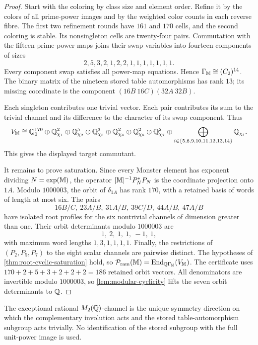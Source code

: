 \begin{proof}
Start with the coloring by class size and element order.  Refine it by the
colors of all prime-power images and by the weighted color counts in each
reverse fibre.  The first two refinement rounds have \(161\) and \(170\)
cells, and the second coloring is stable.  Its nonsingleton cells are
twenty-four pairs.  Commutation with the fifteen prime-power maps joins
their swap variables into fourteen components of sizes
\[
 2,5,3,2,1,2,2,1,1,1,1,1,1,1.
\]
Every component swap satisfies all power-map equations.  Hence
\(\Gamma_{\mathbb M}\cong(C_2)^{14}\).  The binary matrix of the nineteen stored
table automorphisms has rank \(13\); its missing coordinate is the component
\((16B\ 16C)(32A\ 32B)\).

Each singleton contributes one trivial vector.  Each pair contributes its
sum to the trivial channel and its difference to the character of its swap
component.  Thus
\[
 V_{\mathbb M}\cong
 \mathbb Q_{\mathbf1}^{170}\oplus
 \mathbb Q_{\chi_1}^{2}\oplus\mathbb Q_{\chi_2}^{5}\oplus
 \mathbb Q_{\chi_3}^{3}\oplus\mathbb Q_{\chi_4}^{2}\oplus
 \mathbb Q_{\chi_6}^{2}\oplus\mathbb Q_{\chi_7}^{2}
 \oplus\bigoplus_{i\in\{5,8,9,10,11,12,13,14\}}\mathbb Q_{\chi_i}.
\]
This gives the displayed target commutant.

It remains to prove saturation.  Since every Monster element has exponent
dividing \(N=\exp(\mathbb M)\), the operator
\(|\mathbb M|^{-1}P_N^*P_N\) is the coordinate projection onto \(1A\).
Modulo \(1000003\), the orbit of \(\delta_{1A}\) has rank \(170\), with a
retained basis of words of length at most six.  The pairs
\[
 16B/C,\ 23A/B,\ 31A/B,\ 39C/D,\ 44A/B,\ 47A/B
\]
have isolated root profiles for the six nontrivial channels of dimension
greater than one.  Their orbit determinants modulo \(1000003\) are
\[
 1,\ 2,\ 1,\ 1,\ -1,\ 1,
\]
with maximum word lengths \(1,3,1,1,1,1\).  Finally, the restrictions of
\((P_2,P_5,P_7)\) to the eight scalar channels are pairwise distinct.
The hypotheses of \cref{thm:root-cyclic-saturation} hold, so
\(\mathcal P_{\mathrm{ram}}(\mathbb M)=\operatorname{End}_{\mathbb Q\Gamma_{\mathbb M}}(V_{\mathbb M})\).  The certificate uses
\(170+2+5+3+2+2+2=186\) retained orbit vectors.  All denominators are
invertible modulo \(1000003\), so \cref{lem:modular-cyclicity} lifts the
seven orbit determinants to \(\mathbb Q\).
\end{proof}

\begin{remark}
The exceptional rational \(M_2(\mathbb Q)\)-channel is the unique symmetry
direction on which the complementary involution acts and the stored
table-automorphism subgroup acts trivially.  No identification of the
stored subgroup with the full unit-power image is used.
\end{remark}



